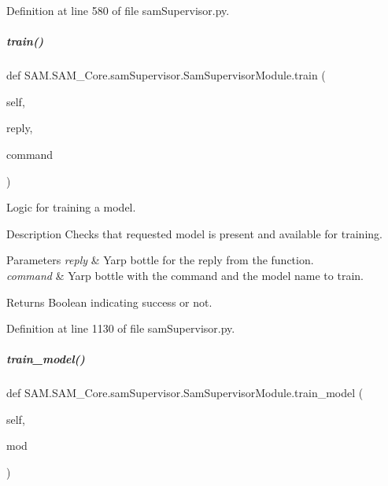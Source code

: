 Definition at line 580 of file sam\+Supervisor.\+py.

\mbox{\label{group__icubclient__SAM__Core_ae075c7cfe2fd460b85dd278373fd8edb}} 
\subparagraph{\texorpdfstring{train()}{train()}}
{\footnotesize\ttfamily def S\+A\+M.\+S\+A\+M\+\_\+\+Core.\+sam\+Supervisor.\+Sam\+Supervisor\+Module.\+train (\begin{DoxyParamCaption}\item[{}]{self,  }\item[{}]{reply,  }\item[{}]{command }\end{DoxyParamCaption})}



Logic for training a model. 

\begin{DoxyParagraph}{Description}
Checks that requested model is present and available for training.
\end{DoxyParagraph}

\begin{DoxyParams}{Parameters}
{\em reply} & Yarp bottle for the reply from the function. \\
\hline
{\em command} & Yarp bottle with the command and the model name to train.\\
\hline
\end{DoxyParams}
\begin{DoxyParagraph}{Returns}
Boolean indicating success or not. 
\end{DoxyParagraph}


Definition at line 1130 of file sam\+Supervisor.\+py.

\mbox{\label{group__icubclient__SAM__Core_abf80e9a30f9625803bea1c5f70a670bc}} 
\subparagraph{\texorpdfstring{train\+\_\+model()}{train\_model()}}
{\footnotesize\ttfamily def S\+A\+M.\+S\+A\+M\+\_\+\+Core.\+sam\+Supervisor.\+Sam\+Supervisor\+Module.\+train\+\_\+model (\begin{DoxyParamCaption}\item[{}]{self,  }\item[{}]{mod }\end{DoxyParamCaption})}



